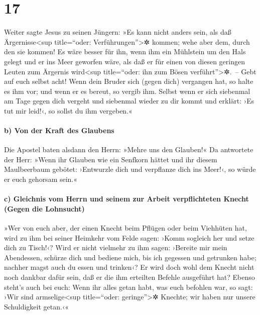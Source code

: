 \hypertarget{section-16}{%
\section{17}\label{section-16}}

 Weiter sagte Jesus zu seinen Jüngern: »Es kann nicht
anders sein, als daß Ärgernisse\textless sup title=``oder:
Verführungen''\textgreater✲ kommen; wehe aber dem, durch den sie kommen!
 Es wäre besser für ihn, wenn ihm ein Mühlstein um den
Hals gelegt und er ins Meer geworfen wäre, als daß er für einen von
diesen geringen Leuten zum Ärgernis wird\textless sup title=``oder: ihn
zum Bösen verführt''\textgreater✲.~--  Gebt auf euch
selbst acht! Wenn dein Bruder sich (gegen dich) vergangen hat, so halte
es ihm vor; und wenn er es bereut, so vergib ihm.  Selbst
wenn er sich siebenmal am Tage gegen dich vergeht und siebenmal wieder
zu dir kommt und erklärt: ›Es tut mir leid!‹, so sollst du ihm
vergeben.«

\hypertarget{b-von-der-kraft-des-glaubens}{%
\paragraph{b) Von der Kraft des
Glaubens}\label{b-von-der-kraft-des-glaubens}}

 Die Apostel baten alsdann den Herrn: »Mehre uns den
Glauben!«  Da antwortete der Herr: »Wenn ihr Glauben wie
ein Senfkorn hättet und ihr diesem Maulbeerbaum gebötet: ›Entwurzle dich
und verpflanze dich ins Meer!‹, so würde er euch gehorsam sein.«

\hypertarget{c-gleichnis-vom-herrn-und-seinem-zur-arbeit-verpflichteten-knecht-gegen-die-lohnsucht}{%
\paragraph{c) Gleichnis vom Herrn und seinem zur Arbeit verpflichteten
Knecht (Gegen die
Lohnsucht)}\label{c-gleichnis-vom-herrn-und-seinem-zur-arbeit-verpflichteten-knecht-gegen-die-lohnsucht}}

 »Wer von euch aber, der einen Knecht beim Pflügen oder
beim Viehhüten hat, wird zu ihm bei seiner Heimkehr vom Felde sagen:
›Komm sogleich her und setze dich zu Tisch!‹?  Wird er
nicht vielmehr zu ihm sagen: ›Bereite mir mein Abendessen, schürze dich
und bediene mich, bis ich gegessen und getrunken habe; nachher magst
auch du essen und trinken‹?  Er wird doch wohl dem Knecht
nicht noch dankbar dafür sein, daß er die ihm erteilten Befehle
ausgeführt hat?  Ebenso steht's auch bei euch: Wenn ihr
alles getan habt, was euch befohlen war, so sagt: ›Wir sind
armselige\textless sup title=``oder: geringe''\textgreater✲ Knechte; wir
haben nur unsere Schuldigkeit getan.‹«

